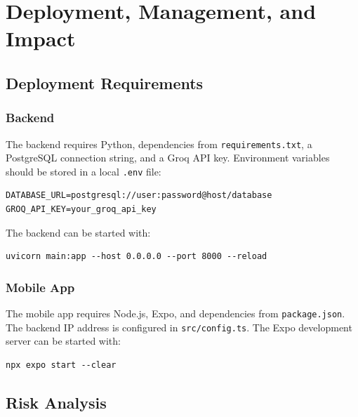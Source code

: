 \documentclass[12pt,a4paper]{report}
\begin{document}
\singlespacing

\chapter{Deployment, Management, and Impact}
\doublespacing

\section{Deployment Requirements}

\subsection{Backend}

The backend requires Python, dependencies from \texttt{requirements.txt}, a PostgreSQL connection string, and a Groq API key. Environment variables should be stored in a local \texttt{.env} file:

\begin{verbatim}
DATABASE_URL=postgresql://user:password@host/database
GROQ_API_KEY=your_groq_api_key
\end{verbatim}

The backend can be started with:

\begin{verbatim}
uvicorn main:app --host 0.0.0.0 --port 8000 --reload
\end{verbatim}

\subsection{Mobile App}

The mobile app requires Node.js, Expo, and dependencies from \texttt{package.json}. The backend IP address is configured in \texttt{src/config.ts}. The Expo development server can be started with:

\begin{verbatim}
npx expo start --clear
\end{verbatim}

\section{Risk Analysis}
\end{document}
